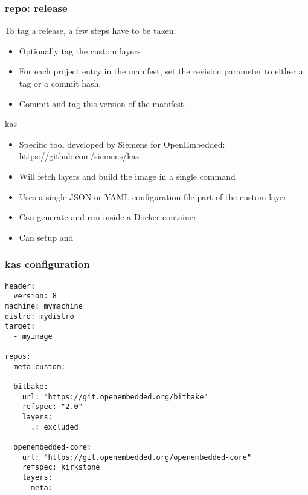 \begin{frame}[fragile]
  \frametitle{repo: release}
  To tag a release, a few steps have to be taken:
  \begin{itemize}
  \item Optionally tag the custom layers
  \item For each project entry in the manifest, set the revision
    parameter to either a tag or a commit hash.
  \item Commit and tag this version of the manifest.
  \end{itemize}
\end{frame}

\begin{frame}[fragile]{kas}
  \begin{itemize}
  \item Specific tool developed by Siemens for OpenEmbedded:
    \url{https://github.com/siemens/kas}
  \item Will fetch layers and build the image in a single command
  \item Uses a single JSON or YAML configuration file part of the
    custom layer
  \item Can generate and run inside a Docker container
  \item Can setup  and 
  \end{itemize}
\end{frame}

\begin{frame}[fragile]
  \frametitle{kas configuration}
  \begin{block}{}
  \fontsize{9}{9}\selectfont
  \begin{verbatim}
header:
  version: 8
machine: mymachine
distro: mydistro
target:
  - myimage

repos:
  meta-custom:

  bitbake:
    url: "https://git.openembedded.org/bitbake"
    refspec: "2.0"
    layers:
      .: excluded

  openembedded-core:
    url: "https://git.openembedded.org/openembedded-core"
    refspec: kirkstone
    layers:
      meta:
  \end{verbatim}
  \end{block}
\end{frame}

